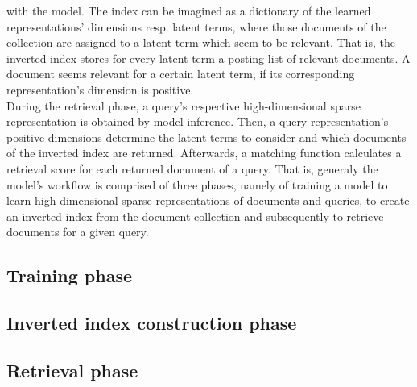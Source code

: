     with the model.
The index can be imagined as a dictionary of 
    the learned representations' dimensions resp. latent terms, 
    where those documents of the collection are assigned to a 
    latent term which seem to be relevant.
That is, the inverted index stores for every latent term a posting list 
    of relevant documents.
A document seems relevant for a certain latent term, if its
    corresponding representation's dimension is positive.\\
During the retrieval phase, a query's respective high-dimensional 
    sparse representation is obtained by model inference.
Then, a query representation's positive dimensions determine
    the latent terms to consider and
    which documents of the inverted index are returned.
Afterwards, a matching function calculates a retrieval score for each
    returned document of a query. 
That is, generaly the model's workflow is comprised of three phases,
    namely of training a model to learn high-dimensional sparse 
    representations of documents and queries,
    to create an inverted index from the document collection
    and subsequently to retrieve documents for a given query.
    \cite{zamani:2018:from-neural-reranking-to-neural-ranking}

\subsection*{Training phase}










\subsection*{Inverted index construction phase}

\subsection*{Retrieval phase}




